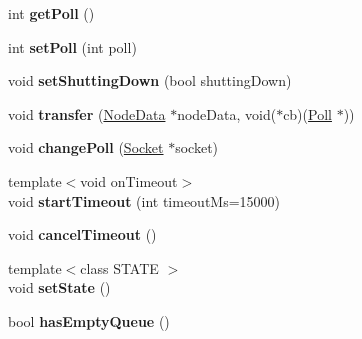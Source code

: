 \begin{DoxyCompactItemize}
\item 
\mbox{\label{structu_s_1_1_socket_a555982b4927aa4fe93e34dc8708445ef}} 
int {\bfseries get\+Poll} ()
\item 
\mbox{\label{structu_s_1_1_socket_ab11380927901b057825537ab0f153d20}} 
int {\bfseries set\+Poll} (int poll)
\item 
\mbox{\label{structu_s_1_1_socket_acd05df2e4a97e47934a356213aefb792}} 
void {\bfseries set\+Shutting\+Down} (bool shutting\+Down)
\item 
\mbox{\label{structu_s_1_1_socket_a7c87c8a0af2f52e3efd6b4cbca88bf61}} 
void {\bfseries transfer} (\mbox{\hyperlink{structu_s_1_1_node_data}{Node\+Data}} $\ast$node\+Data, void($\ast$cb)(\mbox{\hyperlink{struct_poll}{Poll}} $\ast$))
\item 
\mbox{\label{structu_s_1_1_socket_a0a6a0e4adbbd115c8e88a1a00be198e3}} 
void {\bfseries change\+Poll} (\mbox{\hyperlink{structu_s_1_1_socket}{Socket}} $\ast$socket)
\item 
\mbox{\label{structu_s_1_1_socket_a97f8c1006871b3b39d66d85c7effa4d5}} 
{\footnotesize template$<$void  on\+Timeout$>$ }\\void {\bfseries start\+Timeout} (int timeout\+Ms=15000)
\item 
\mbox{\label{structu_s_1_1_socket_a4ce1bf5d0098ad1346a99bd71530b7de}} 
void {\bfseries cancel\+Timeout} ()
\item 
\mbox{\label{structu_s_1_1_socket_a8a172747528e58a85c682abf483ed59a}} 
{\footnotesize template$<$class S\+T\+A\+TE $>$ }\\void {\bfseries set\+State} ()
\item 
\mbox{\label{structu_s_1_1_socket_a4a6647b9d962984c23ecf89a3d5b6efd}} 
bool {\bfseries has\+Empty\+Queue} ()
\item 
\mbox{\label{structu_s_1_1_socket_a4d1bf51315b6dd297047b29a5a8db8fe}} 

\end{DoxyCompactItemize}
